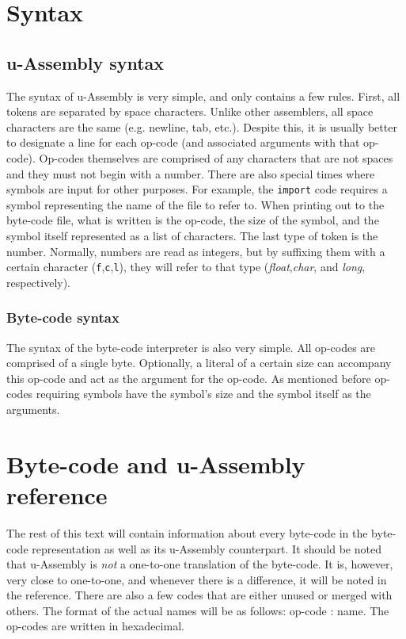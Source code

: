 \documentclass[12pt]{report}
\begin{document}
  \chapter{Syntax}
  \section{u-Assembly syntax}
  The syntax of u-Assembly is very simple, and only contains a few rules.  First, all
  tokens are separated by space characters.  Unlike other assemblers, all space
  characters are the same (e.g. newline, tab, etc.).  Despite this, it is usually
  better to designate a line for each op-code (and associated arguments with that
  op-code).  Op-codes themselves are comprised of any characters that are not
  spaces and they must not begin with a number.  There are also special times where
  symbols are input for other purposes.  For example, the \verb|import| code requires
  a symbol representing the name of the file to refer to.  When printing out to the
  byte-code file, what is written is the op-code, the size of the symbol, and
  the symbol itself represented as a list of characters.  The last type of token is
  the number.  Normally, numbers are read as integers, but by suffixing them with a
  certain character (\verb|f|,\verb|c|,\verb|l|), they will refer to that type
  (\emph{float},\emph{char}, and \emph{long}, respectively).
  \subsection{Byte-code syntax}
  The syntax of the byte-code interpreter is also very simple.  All op-codes are
  comprised of a single byte.  Optionally, a literal of a certain size can
  accompany this op-code and act as the argument for the op-code.  As mentioned before
  op-codes requiring symbols have the symbol's size and the symbol itself as the
  arguments.
  \chapter{Byte-code and u-Assembly reference}
  The rest of this text will contain information about every byte-code in the 
  byte-code representation as well as its u-Assembly counterpart.  It should be noted
  that u-Assembly is \emph{not} a one-to-one translation of the byte-code.  It is,
  however, very close to one-to-one, and whenever there is a difference, it will be
  noted in the reference.  There are also a few codes that are either unused or
  merged with others.  The format of the actual names will be as follows:
  op-code : name.  The op-codes are written in hexadecimal.
\end{document}

